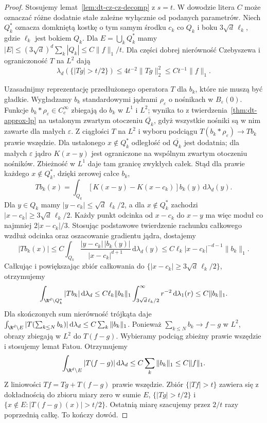 \begin{proof}
Stosujemy lemat~\ref{lem:dt-cz-cz-decomp} z $s=t$.
W dowodzie litera $C$ może oznaczać różne dodatnie
stałe zależne wyłącznie od podanych parametrów.
Niech $Q_k^*$ oznacza domkniętą kostkę o tym samym środku
$c_k$ co $Q_k$ i boku $3\sqrt d\,\ell_k$,
gdzie $\ell_k$ jest bokiem $Q_k$. Dla
$E=\bigcup_k Q_k^*$ mamy
$|E|\le(3\sqrt d)^d\sum_k|Q_k|\le C\|f\|_1/t$.
Dla części dobrej nierówność Czebyszewa i
ograniczoność $T$ na $L^2$ dają
\[
 \lambda_d(\{|Tg|>t/2\})
 \le 4t^{-2}\|Tg\|_2^2
 \le Ct^{-1}\|f\|_1.
\]

Uzasadnijmy reprezentację przedłużonego operatora $T$
dla $b_k$, które nie muszą być gładkie.
Wygładzamy $b_k$ standardowymi jądrami
$\rho_\varepsilon$ o nośnikach w $B_\varepsilon(0)$.
Funkcje $b_k*\rho_\varepsilon\in C_c^\infty$
zbiegają do $b_k$ w $L^1$ i $L^2$; wynika to
z twierdzenia~\ref{thm:dt-approx-lp} na ustalonym
zwartym otoczeniu $\overline{Q_k}$, gdyż wszystkie
nośniki są w nim zawarte dla małych $\varepsilon$.
Z ciągłości $T$ na $L^2$ i wyboru podciągu
$T(b_k*\rho_\varepsilon)\to Tb_k$ prawie wszędzie.
Dla ustalonego $x\notin Q_k^*$ odległość od
$\overline{Q_k}$ jest dodatnia; dla małych
$\varepsilon$ jądro $K(x-y)$ jest ograniczone
na wspólnym zwartym otoczeniu nośników.
Zbieżność w $L^1$ daje tam granicę zwykłych całek.
Stąd dla prawie każdego $x\notin Q_k^*$, dzięki zerowej
całce $b_k$,
\[
 Tb_k(x)=\int_{Q_k}[K(x-y)-K(x-c_k)]
 b_k(y)\,\mathrm d\lambda_d(y).
\]
Dla $y\in Q_k$ mamy $|y-c_k|\le\sqrt d\,\ell_k/2$,
a dla $x\notin Q_k^*$ zachodzi
$|x-c_k|\ge3\sqrt d\,\ell_k/2$.
Każdy punkt odcinka od $x-c_k$ do $x-y$ ma więc
moduł co najmniej $2|x-c_k|/3$. Stosując podstawowe
twierdzenie rachunku całkowego wzdłuż odcinka oraz
oszacowanie gradientu jądra, dostajemy
\[
 |Tb_k(x)|\le C\int_{Q_k}
 \frac{|y-c_k|\,|b_k(y)|}{|x-c_k|^{d+1}}
 \,\mathrm d\lambda_d(y)
 \le C\ell_k |x-c_k|^{-d-1}\|b_k\|_1.
\]
Całkując i powiększając zbiór całkowania do
$\{|x-c_k|\ge3\sqrt d\,\ell_k/2\}$, otrzymujemy
\[
 \int_{\R^d\setminus Q_k^*}|Tb_k|\,\mathrm d\lambda_d
 \le C\ell_k\|b_k\|_1
 \int_{3\sqrt d\,\ell_k/2}^\infty r^{-2}\,\mathrm d\lambda_1(r)
 \le C\|b_k\|_1.
\]
Dla skończonych sum nierówność trójkąta daje
$\int_{\R^d\setminus E}|T(\sum_{k\le N}b_k)|
\,\mathrm d\lambda_d\le C\sum_k\|b_k\|_1$.
Ponieważ $\sum_{k\le N}b_k\to f-g$ w $L^2$,
obrazy zbiegają w $L^2$ do $T(f-g)$.
Wybieramy podciąg zbieżny prawie wszędzie
i stosujemy lemat Fatou. Otrzymujemy
\[
 \int_{\R^d\setminus E}|T(f-g)|\,\mathrm d\lambda_d
 \le C\sum_k\|b_k\|_1\le C\|f\|_1.
\]
Z liniowości $Tf=Tg+T(f-g)$ prawie wszędzie.
Zbiór $\{|Tf|>t\}$ zawiera się z dokładnością
do zbioru miary zero w sumie $E$,
$\{|Tg|>t/2\}$ i
$\{x\notin E:|T(f-g)(x)|>t/2\}$.
Ostatnią miarę szacujemy przez $2/t$ razy
poprzednią całkę. To kończy dowód.
\end{proof}

